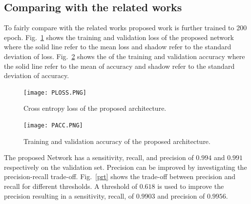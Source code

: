 \subsection{Comparing with the related works}
To fairly compare with the related works proposed work is further trained to 200 epoch. Fig.~\ref{ploss} shows the training and validation loss of the proposed network where the solid line refer to the mean loss and shadow refer to the standard deviation of loss. Fig.~\ref{pacc} shows the of the training and validation accuracy where the solid line refer to the mean of accuracy and shadow refer to the standard deviation of accuracy. 
\begin{center}
\begin{figure}[htbp]
\centerline{\texttt{[image: PLOSS.PNG]}}
\caption{Cross entropy loss of the proposed architecture.}
\label{ploss}
\end{figure}
\end{center}
\begin{center}
\begin{figure}[htbp]
\centerline{\texttt{[image: PACC.PNG]}}
\caption{Training and validation accuracy of the proposed architecture.}
\label{pacc}
\end{figure}
\end{center}
The proposed Network has a sensitivity, recall, and precision of $0.994$ and $0.991$ respectively on the validation set. Precision can be improved by investigating the precision-recall trade-off. Fig.~\ref{prt} shows the trade-off between precision and recall for different thresholds. A threshold of $0.618$ is used to improve the precision resulting in a sensitivity, recall, of $0.9903$ and precision of $0.9956$.


